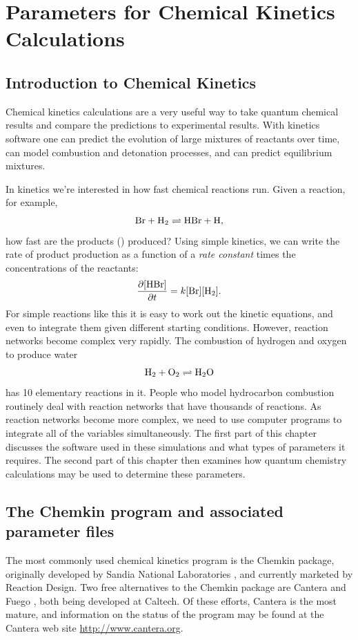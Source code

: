 \chapter{Parameters for Chemical Kinetics Calculations}

\graphicspath{{./Figures/Kinetics/}}

\section{Introduction to Chemical Kinetics} 
Chemical kinetics calculations are a very useful way to take quantum
chemical results and compare the predictions to experimental
results. With kinetics software one can predict the evolution of large
mixtures of reactants over time, can model combustion and detonation
processes, and can predict equilibrium mixtures. 

In kinetics we're interested in how fast chemical reactions run. Given
a reaction, for example,
\begin{equation}
 \mathrm{Br} + \mathrm{H_2} \rightleftharpoons \mathrm{HBr} + \mathrm{H},
\end{equation}
how fast are the products () produced? Using simple
kinetics, we can write the rate of product production as a function of
a \emph{rate constant} times the concentrations of the reactants:
\begin{equation}
 \frac{\partial [\mathrm{HBr}]}{\partial t} =
  k[\mathrm{Br}][\mathrm{H_2}].
\end{equation}
For simple reactions like this it is easy to work out the kinetic
equations, and even to integrate them given different starting
conditions. However, reaction networks become complex very
rapidly. The combustion of hydrogen and oxygen to produce water
\begin{equation}
 \mathrm{H_2} + \mathrm{O_2} \rightleftharpoons \mathrm{H_2O}
\end{equation}
has 10 elementary reactions in it. People who model hydrocarbon
combustion routinely deal with reaction networks that have thousands
of reactions. As reaction networks become more complex, we need to use
computer programs to integrate all of the variables
simultaneously. The first part of this chapter discusses the software
used in these simulations and what types of parameters it
requires. The second part of this chapter then examines how quantum
chemistry calculations may be used to determine these parameters.

\section{The Chemkin program and associated parameter files} 
The most commonly used chemical kinetics program is the Chemkin
package, originally developed by Sandia National Laboratories
\cite{chemkin2}, and currently marketed by Reaction Design. Two free
alternatives to the Chemkin package are Cantera \cite{Goodwin02} and
Fuego \cite{Aivazis02}, both being developed at Caltech. Of these
efforts, Cantera is the most mature, and information on the status of
the program may be found at the Cantera web site
\href{http://www.cantera.org}{http://www.cantera.org}.

